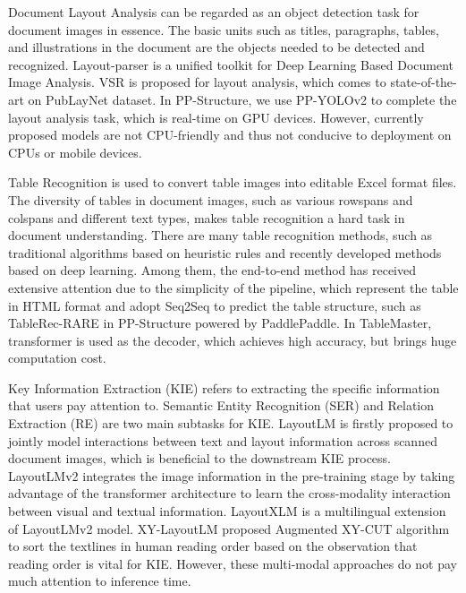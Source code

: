 \documentclass[letterpaper]{article} \usepackage{aaai21}  \usepackage{times}  \usepackage{helvet} \usepackage{courier}  \usepackage[hyphens]{url}  \usepackage{graphicx} \usepackage{algorithm}
\begin{document}
Document Layout Analysis can be regarded as an object detection task for document images in essence. The basic units such as titles, paragraphs, tables, and illustrations in the document are the objects needed to be detected and recognized. Layout-parser\cite{layoutparser} is a unified toolkit for Deep Learning Based Document Image Analysis. VSR\cite{vsr} is proposed for layout analysis, which comes to state-of-the-art on PubLayNet dataset\cite{publaynet}. In PP-Structure, we use PP-YOLOv2\cite{ppyolov2} to complete the layout analysis task, which is real-time on GPU devices. However, currently proposed models are not CPU-friendly and thus not conducive to deployment on CPUs or mobile devices.

Table Recognition is used to convert table images into editable Excel format files. The diversity of tables in document images, such as various rowspans and colspans and different text types, makes table recognition a hard task in document understanding. There are many table recognition methods, such as traditional algorithms based on heuristic rules and recently developed methods based on deep learning. Among them, the end-to-end method has received extensive attention due to the simplicity of the pipeline, which represent the table in HTML format and adopt Seq2Seq\cite{seq2seq} to predict the table structure, such as TableRec-RARE\cite{TableRec-RARE} in PP-Structure powered by PaddlePaddle\cite{paddlepaddle}. In TableMaster\cite{TableMaster}, transformer is used as the decoder, which achieves high accuracy, but brings huge computation cost.

Key Information Extraction (KIE) refers to extracting the specific information that users pay attention to. Semantic Entity Recognition (SER) and Relation Extraction (RE) are two main subtasks for KIE. LayoutLM\cite{layoutlm} is firstly proposed to jointly model interactions between text and layout information across scanned document images, which is beneficial to the downstream KIE process. LayoutLMv2\cite{layoutlmv2} integrates the image information in the pre-training stage by taking advantage of the transformer architecture to learn the cross-modality interaction between visual and textual information. LayoutXLM\cite{layoutxlm} is a multilingual extension of LayoutLMv2\cite{layoutlmv2} model. XY-LayoutLM \cite{xylayoutlm} proposed Augmented XY-CUT algorithm to sort the textlines in human reading order based on the observation that reading order is vital for KIE. However, these multi-modal approaches do not pay much attention to inference time.
\end{document}
